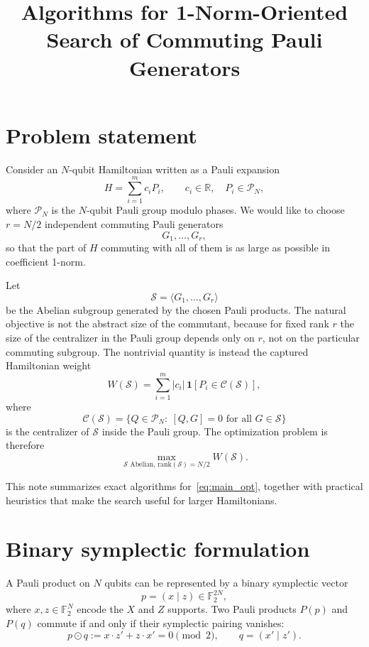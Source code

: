 \documentclass[11pt]{article}
\title{Algorithms for 1-Norm-Oriented Search of Commuting Pauli Generators}
\author{}
\date{}
\newcommand{\F}{\mathbb{F}_2}
\newcommand{\rank}{\mathrm{rank}}
\newcommand{\cP}{\mathcal{P}}
\newcommand{\cS}{\mathcal{S}}
\newcommand{\cC}{\mathcal{C}}
\begin{document}
\maketitle

\section{Problem statement}
Consider an $N$-qubit Hamiltonian written as a Pauli expansion
\begin{equation}
  H = \sum_{i=1}^m c_i P_i,
  \qquad c_i\in \mathbb{R}, \quad P_i\in \cP_N,
\end{equation}
where $\cP_N$ is the $N$-qubit Pauli group modulo phases. We would like to choose $r=N/2$ independent commuting Pauli generators
\begin{equation}
  G_1,\dots,G_r,
\end{equation}
so that the part of $H$ commuting with all of them is as large as possible in coefficient 1-norm.

Let
\begin{equation}
  \cS = \langle G_1,\dots,G_r \rangle
\end{equation}
be the Abelian subgroup generated by the chosen Pauli products. The natural objective is not the abstract size of the commutant, because for fixed rank $r$ the size of the centralizer in the Pauli group depends only on $r$, not on the particular commuting subgroup. The nontrivial quantity is instead the captured Hamiltonian weight
\begin{equation}
  W(\cS) = \sum_{i=1}^m |c_i| \, \mathbf{1}[P_i \in \cC(\cS)],
  \label{eq:objective}
\end{equation}
where
\begin{equation}
  \cC(\cS)=\{Q\in \cP_N:\ [Q,G]=0 \text{ for all } G\in \cS\}
\end{equation}
is the centralizer of $\cS$ inside the Pauli group. The optimization problem is therefore
\begin{equation}
  \max_{\cS\text{ Abelian},\,\rank(\cS)=N/2} W(\cS).
  \label{eq:main_opt}
\end{equation}

This note summarizes exact algorithms for~\eqref{eq:main_opt}, together with practical heuristics that make the search useful for larger Hamiltonians.

\section{Binary symplectic formulation}
A Pauli product on $N$ qubits can be represented by a binary symplectic vector
\begin{equation}
  p=(x\mid z)\in \F^{2N},
\end{equation}
where $x,z\in \F^N$ encode the $X$ and $Z$ supports. Two Pauli products $P(p)$ and $P(q)$ commute if and only if their symplectic pairing vanishes:
\begin{equation}
  p\odot q := x\cdot z' + z\cdot x' = 0 \pmod 2,
  \qquad q=(x'\mid z').
\end{equation}
\end{document}
